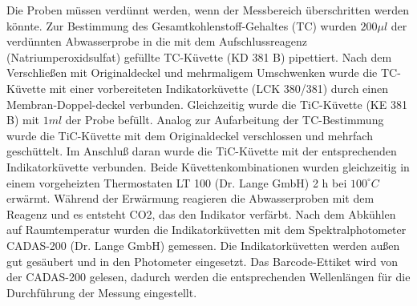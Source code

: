 Die Proben müssen verdünnt werden, wenn der Messbereich überschritten werden könnte.  Zur Bestimmung des Gesamtkohlenstoff-Gehaltes (TC) wurden $200 \mu l$ der verdünnten Abwasserprobe in die mit dem Aufschlussreagenz (Natriumperoxidsulfat) gefüllte TC-Küvette (KD 381 B) pipettiert. Nach dem Verschließen mit Originaldeckel und mehrmaligem Umschwenken wurde die TC-Küvette mit einer vorbereiteten Indikatorküvette (LCK 380/381) durch einen Membran-Doppel-deckel verbunden. Gleichzeitig wurde die TiC-Küvette (KE 381 B) mit $1 ml$ der Probe befüllt. Analog zur Aufarbeitung der TC-Bestimmung wurde die TiC-Küvette mit dem Originaldeckel verschlossen und mehrfach geschüttelt. Im Anschluß daran wurde die TiC-Küvette mit der entsprechenden Indikatorküvette verbunden. Beide Küvettenkombinationen wurden gleichzeitig in einem vorgeheizten Thermostaten LT 100 (Dr. Lange GmbH) 2 h bei $100^{\circ}C$ erwärmt. Während der Erwärmung reagieren die Abwasserproben mit dem Reagenz und es entsteht CO2, das den Indikator verfärbt. Nach dem Abkühlen auf Raumtemperatur wurden die Indikatorküvetten mit dem Spektralphotometer CADAS-200 (Dr. Lange GmbH) gemessen. Die Indikatorküvetten werden außen gut gesäubert und in den Photometer eingesetzt. Das Barcode-Ettiket wird von der CADAS-200 gelesen, dadurch werden die entsprechenden Wellenlängen für die Durchführung der Messung eingestellt.   

